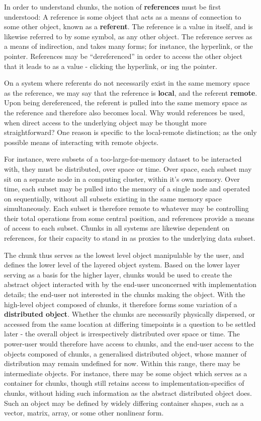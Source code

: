 In order to understand chunks, the notion of \textbf{references} must be
first understood: A reference is some object that acts as a means of
connection to some other object, known as a \textbf{referent}. The
reference is a value in itself, and is likewise referred to by some
symbol, as any other object. The reference serves as a means of
indirection, and takes many forms; for instance, the hyperlink, or the
pointer. References may be ``dereferenced'' in order to access the other
object that it leads to as a value - clicking the hyperlink, or
ing the pointer.

On a system where referents do not necessarily exist in the same memory
space as the reference, we may say that the reference is \textbf{local},
and the referent \textbf{remote}. Upon being dereferenced, the referent
is pulled into the same memory space as the reference and therefore also
becomes local. Why would references be used, when direct access to the
underlying object may be thought more straightforward? One reason is
specific to the local-remote distinction; as the only possible means of
interacting with remote objects.

For instance, were subsets of a too-large-for-memory dataset to be
interacted with, they must be distributed, over space or time. Over
space, each subset may sit on a separate node in a computing cluster,
within it's own memory. Over time, each subset may be pulled into the
memory of a single node and operated on sequentially, without all
subsets existing in the same memory space simultaneously. Each subset is
therefore remote to whatever may be controlling their total operations
from some central position, and references provide a means of access to
each subset. Chunks in all systems are likewise dependent on references,
for their capacity to stand in as proxies to the underlying data subset.

The chunk thus serves as the lowest level object manipulable by the
user, and defines the lower level of the layered object system. Based on
the lower layer serving as a basis for the higher layer, chunks would be
used to create the abstract object interacted with by the end-user
unconcerned with implementation details; the end-user not interested in
the chunks making the object. With the high-level object composed of
chunks, it therefore forms some variation of a \textbf{distributed
    object}. Whether the chunks are necessarily physically dispersed, or
accessed from the same location at differing timepoints is a question to
be settled later - the overall object is irrespectively distributed over
space or time. The power-user would therefore have access to chunks, and
the end-user access to the objects composed of chunks, a generalised
distributed object, whose manner of distribution may remain undefined
for now. Within this range, there may be intermediate objects. For
instance, there may be some object which serves as a container for
chunks, though still retains access to implementation-specifics of
chunks, without hiding such information as the abstract distributed
object does. Such an object may be defined by widely differing container
shapes, such as a vector, matrix, array, or some other nonlinear form.

